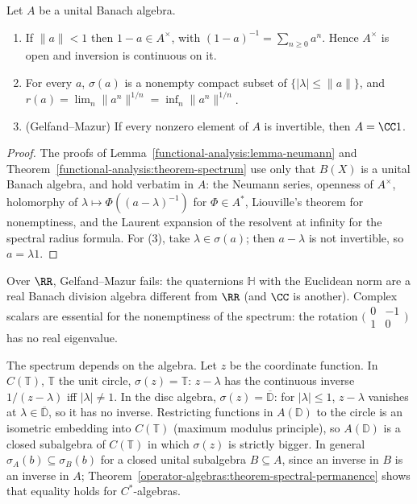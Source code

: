 \begin{theorem}\label{operator-algebras:theorem-spectrum-banach-algebra}
Let $A$ be a unital Banach algebra.
\begin{enumerate}
\item If $\|a\| < 1$ then $1 - a \in A^\times$, with $(1 - a)^{-1} = \sum_{n \geq 0}a^n$. Hence $A^\times$ is open and inversion is continuous on it.
\item For every $a$, $\sigma(a)$ is a nonempty compact subset of $\{|\lambda| \leq \|a\|\}$, and $r(a) = \lim_n\|a^n\|^{1/n} = \inf_n\|a^n\|^{1/n}$.
\item (Gelfand--Mazur) If every nonzero element of $A$ is invertible, then $A = \CC1$.
\end{enumerate}
\end{theorem}

\begin{proof}
The proofs of Lemma~\ref{functional-analysis:lemma-neumann} and Theorem~\ref{functional-analysis:theorem-spectrum} use only that $B(X)$ is a unital Banach algebra, and hold verbatim in $A$: the Neumann series, openness of
$A^\times$, holomorphy of $\lambda \mapsto \Phi((a - \lambda)^{-1})$ for $\Phi \in A^*$, Liouville's theorem for nonemptiness, and the Laurent expansion of the resolvent at infinity for the spectral radius formula. For (3),
take $\lambda \in \sigma(a)$; then $a - \lambda$ is not invertible, so $a = \lambda1$.
\end{proof}

\begin{counterexample}\label{operator-algebras:counterexample-real-division}
Over $\RR$, Gelfand--Mazur fails: the quaternions $\mathbb{H}$ with the Euclidean norm are a real Banach division algebra different from $\RR$ (and $\CC$ is another). Complex scalars are essential for the nonemptiness of the
spectrum: the rotation $\bigl(\begin{smallmatrix}0 & -1\\ 1 & 0\end{smallmatrix}\bigr)$ has no real eigenvalue.
\end{counterexample}

\begin{example}\label{operator-algebras:example-spectrum-subalgebra}
The spectrum depends on the algebra. Let $z$ be the coordinate function. In $C(\mathbb{T})$, $\mathbb{T}$ the unit circle, $\sigma(z) = \mathbb{T}$: $z - \lambda$ has the continuous inverse $1/(z - \lambda)$ iff $|\lambda| \neq 1$. In
the disc algebra, $\sigma(z) = \overline{\mathbb{D}}$: for $|\lambda| \leq 1$, $z - \lambda$ vanishes at $\lambda \in \overline{\mathbb{D}}$, so it has no inverse. Restricting functions in $A(\mathbb{D})$ to the circle is an isometric
embedding into $C(\mathbb{T})$ (maximum modulus principle), so $A(\mathbb{D})$ is a closed subalgebra of $C(\mathbb{T})$ in which $\sigma(z)$ is strictly bigger. In general $\sigma_A(b) \subseteq \sigma_B(b)$ for a closed unital
subalgebra $B \subseteq A$, since an inverse in $B$ is an inverse in $A$; Theorem~\ref{operator-algebras:theorem-spectral-permanence} shows that equality holds for $C^*$-algebras.
\end{example}

